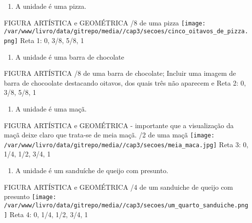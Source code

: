 \documentclass[a4,12pt]{book}
\begin{document}
\begin{enumerate} [\quad a)] %
  \item     A unidade é uma pizza. 
\end{enumerate} %
\begin{imagem*}[breakable]{}{}   FIGURA ARTÍSTICA e GEOMÉTRICA   \mbox{} /8 de uma pizza   \mbox{} \newline        \texttt{[image: /var/www/livro/data/gitrepo/media//cap3/secoes/cinco\_oitavos\_de\_pizza.png]}     \mbox{} \newline    Reta 1: 0, 3/8, 5/8, 1 \end{imagem*}
\begin{enumerate} [\quad a)] %
  \item     A unidade é uma barra de chocolate 
\end{enumerate} %
\begin{imagem*}[breakable]{}{}   FIGURA ARTÍSTICA   \mbox{} /8 de uma barra de chocolate;   \mbox{} \newline    Incluir uma imagem de barra de chocoolate destacando oitavos, dos quais três não aparecem e   \mbox{} \newline    Reta 2: 0, 3/8, 5/8, 1 \end{imagem*}
\begin{enumerate} [\quad a)] %
  \item     A unidade é uma maçã. 
\end{enumerate} %
\begin{imagem*}[breakable]{}{}   FIGURA ARTÍSTICA  e GEOMÉTRICA - importante que a visualização da maçã deixe claro que trata-se de meia maçã.   \mbox{} /2 de uma maçã     \texttt{[image: /var/www/livro/data/gitrepo/media//cap3/secoes/meia\_maca.jpg]}     \mbox{} \newline    Reta 3: 0, 1/4, 1/2, 3/4, 1 \end{imagem*}
\begin{enumerate} [\quad a)] %
  \item     A unidade é um sanduíche de queijo com presunto. 
\end{enumerate} %
\begin{imagem*}[breakable]{}{}   FIGURA ARTÍSTICA  e GEOMÉTRICA   \mbox{} /4 de um  sanduiche de queijo com presunto   \mbox{} \newline        \texttt{[image: /var/www/livro/data/gitrepo/media//cap3/secoes/um\_quarto\_sanduiche.png]}     \mbox{} \newline    Reta 4: 0, 1/4, 1/2, 3/4, 1 \end{imagem*}
\end{document}
